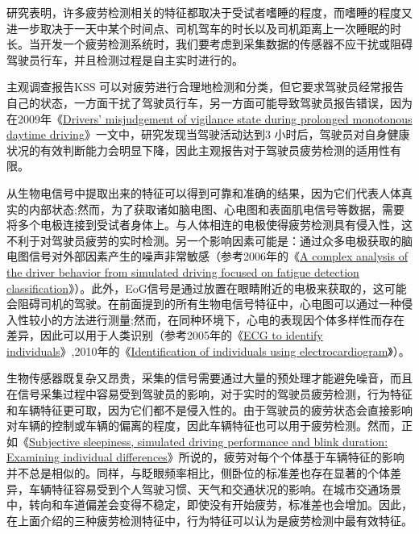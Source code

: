 研究表明，许多疲劳检测相关的特征都取决于受试者嗜睡的程度，而嗜睡的程度又进一步取决于一天中某个时间点、司机驾车的时长以及司机距离上一次睡眠的时长。当开发一个疲劳检测系统时，我们要考虑到采集数据的传感器不应干扰或阻碍驾驶员行车，并且检测过程是自主实时进行的。

主观调查报告KSS 可以对疲劳进行合理地检测和分类，但它要求驾驶员经常报告自己的状态，一方面干扰了驾驶员行车，另一方面可能导致驾驶员报告错误，因为在2009年《\href{https://www.baidu.com/link?url=e2XCc1kghhdalxqr4l4AHikYS8UUH347GgQY7ceGatW3wzN3R_YQqLv5FKa-in3kLRGY85EmQNFesRAKR7mN9_&wd=&eqid=b9e2839900227c2d00000002603e3b1c}{Drivers’ misjudgement of vigilance state during
prolonged monotonous daytime driving}》一文中，研究发现当驾驶活动达到3 小时后，驾驶员对自身健康状况的有效判断能力会明显下降，因此主观报告对于驾驶员疲劳检测的适用性有限。

从生物电信号中提取出来的特征可以得到可靠和准确的结果，因为它们代表人体真实的内部状态;然而，为了获取诸如脑电图、心电图和表面肌电信号等数据，需要将多个电极连接到受试者身体上。与人体相连的电极使得疲劳检测具有侵入性，这不利于对驾驶员疲劳的实时检测。另一个影响因素可能是：通过众多电极获取的脑电图信号对外部因素产生的噪声非常敏感（参考2006年的《\href{https://xueshu.baidu.com/usercenter/paper/show?paperid=01fdcb2a2c4b5c05b4170b9c0d553a32&site=xueshu_se&hitarticle=1}{A complex analysis of the driver behavior from simulated
driving focused on fatigue detection classification}》）。此外，EoG信号是通过放置在眼睛附近的电极来获取的，这可能会阻碍司机的驾驶。在前面提到的所有生物电信号特征中，心电图可以通过一种侵入性较小的方法进行测量;然而，在同种环境下，心电的表现因个体多样性而存在差异，因此可以用于人类识别（参考2005年的《\href{https://xueshu.baidu.com/usercenter/paper/show?paperid=f241adbfa836f474cc236e9b7e9b110a&site=xueshu_se}{ECG to identify individuals}》,2010年的《\href{https://xueshu.baidu.com/usercenter/paper/show?paperid=b2174f5b8f08112d8247be00de45f5e0&site=xueshu_se&hitarticle=1}{Identification of individuals using electrocardiogram}》）。

生物传感器既复杂又昂贵，采集的信号需要通过大量的预处理才能避免噪音，而且在信号采集过程中容易受到驾驶员的影响，对于实时的驾驶员疲劳检测，行为特征和车辆特征更可取，因为它们都不是侵入性的。由于驾驶员的疲劳状态会直接影响对车辆的控制或车辆的偏离的程度，因此车辆特征也可以用于疲劳检测。然而，正如《\href{https://xueshu.baidu.com/usercenter/paper/show?paperid=56d31fd90628e2f1207568df728e0c81&site=xueshu_se}{Subjective sleepiness, simulated driving performance and blink duration: Examining individual differences}》所说的，疲劳对每个个体基于车辆特征的影响并不总是相似的。同样，与眨眼频率相比，侧卧位的标准差也存在显著的个体差异，车辆特征容易受到个人驾驶习惯、天气和交通状况的影响。在城市交通场景中，转向和车道偏差会变得不稳定，即使没有开始疲劳，标准差也会增加。因此，在上面介绍的三种疲劳检测特征中，行为特征可以认为是疲劳检测中最有效特征。

